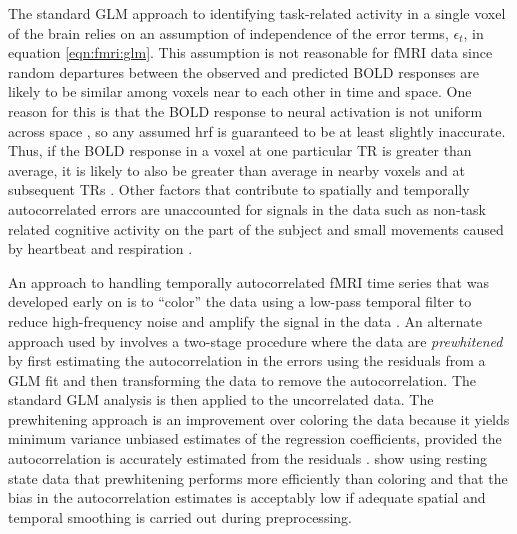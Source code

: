 The standard GLM approach to identifying task-related activity in a single voxel of the brain relies on an assumption of independence of the error terms, $\epsilon_t$, in equation \eqref{eqn:fmri:glm}. This assumption is not reasonable for fMRI data since random departures between the observed and predicted BOLD responses are likely to be similar among voxels near to each other in time and space. One reason for this is that the BOLD response to neural activation is not uniform across space \citep{aguirre:zarahn:varyBOLD:1998}, so any assumed hrf is guaranteed to be at least slightly inaccurate. Thus, if the BOLD response in a voxel at one particular TR is greater than average, it is likely to also be greater than average in nearby voxels and at subsequent TRs \cite[Chapter 1][]{ashby:fmri:2011}. Other factors that contribute to spatially and temporally autocorrelated errors are unaccounted for signals in the data such as non-task related cognitive activity on the part of the subject and small movements caused by heartbeat and respiration \citep{loc:jos:arma:1997}.

An approach to handling temporally autocorrelated fMRI time series that was developed early on is to ``color'' the data using a low-pass temporal filter to reduce high-frequency noise and amplify the signal in the data \citep{friston:holmes:color:1995,wors:frist:color:1995}. An alternate approach used by \citet{bullmore:prewhiten:1996} involves a two-stage procedure where the data are \emph{prewhitened} by first estimating the autocorrelation in the errors using the residuals from a GLM fit and then transforming the data to remove the autocorrelation. The standard GLM analysis is then applied to the uncorrelated data. The prewhitening approach is an improvement over coloring the data because it yields minimum variance unbiased estimates of the regression coefficients, provided the autocorrelation is accurately estimated from the residuals \citep{frist:penny:classical:2002}. \citet{wool:rip:auto:2001} show using resting state data that prewhitening performs more efficiently than coloring and that the bias in the autocorrelation estimates is acceptably low if adequate spatial and temporal smoothing is carried out during preprocessing.

